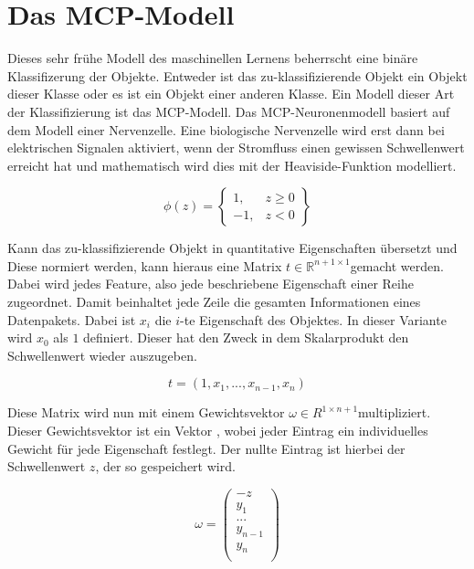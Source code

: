 \documentclass[11pt]{article} %
\begin{document}
\section{Das MCP-Modell}
Dieses sehr frühe Modell des maschinellen Lernens beherrscht eine binäre Klassifizerung der Objekte. Entweder ist das zu-klassifizierende 
Objekt ein Objekt dieser Klasse oder es ist ein Objekt einer anderen Klasse. Ein Modell dieser Art der Klassifizierung ist das MCP-Modell.
Das MCP-Neuronenmodell basiert auf dem Modell einer Nervenzelle. Eine biologische Nervenzelle wird erst dann bei elektrischen Signalen
aktiviert, wenn der Stromfluss einen gewissen Schwellenwert erreicht hat und mathematisch wird dies mit der Heaviside-Funktion modelliert.

\begin{equation}
\phi(z) =  \begin{Bmatrix}
1, &  z \geq 0 \\
-1, & z < 0
\end{Bmatrix} 
\end{equation}

Kann das zu-klassifizierende Objekt in quantitative Eigenschaften übersetzt und Diese normiert werden, kann hieraus eine Matrix  $t \in \mathbb{R}^{n+1 \times 1} $gemacht werden. Dabei wird jedes Feature, also jede beschriebene Eigenschaft einer Reihe zugeordnet. Damit beinhaltet jede Zeile die gesamten Informationen eines Datenpakets. Dabei ist $x_{i}$ die $i$-te Eigenschaft des Objektes. In dieser Variante wird $x_{0}$ als $1$ definiert. Dieser hat den Zweck in dem Skalarprodukt den Schwellenwert wieder auszugeben. 

\begin{equation}
t = (1, x_{1}, ..., x_{n-1}, x_{n})
\end{equation}

Diese Matrix wird nun mit einem Gewichtsvektor $\omega \in {R}^{1 \times n+1}$multipliziert. Dieser Gewichtsvektor ist ein Vektor , wobei
jeder Eintrag ein individuelles Gewicht für jede Eigenschaft festlegt. Der nullte Eintrag ist hierbei der Schwellenwert $z$, der so gespeichert wird.

\begin{equation}
\omega = \begin{pmatrix}
-z\\
y_{1}\\
... \\
y_{n-1} \\
y_{n} \\
\end{pmatrix} 
\end{equation}
\end{document}
